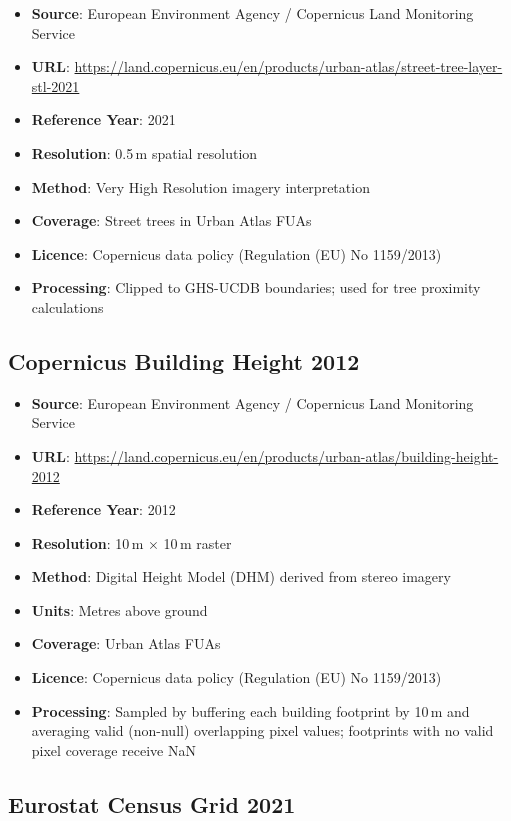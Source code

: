 \begin{itemize}
  \item \textbf{Source}: European Environment Agency / Copernicus Land Monitoring Service
  \item \textbf{URL}: \url{https://land.copernicus.eu/en/products/urban-atlas/street-tree-layer-stl-2021}
  \item \textbf{Reference Year}: 2021
  \item \textbf{Resolution}: 0.5\,m spatial resolution
  \item \textbf{Method}: Very High Resolution imagery interpretation
  \item \textbf{Coverage}: Street trees in Urban Atlas FUAs
  \item \textbf{Licence}: Copernicus data policy (Regulation (EU) No 1159/2013)
  \item \textbf{Processing}: Clipped to GHS-UCDB boundaries; used for tree proximity calculations
\end{itemize}

\subsection{Copernicus Building Height 2012}

\begin{itemize}
  \item \textbf{Source}: European Environment Agency / Copernicus Land Monitoring Service
  \item \textbf{URL}: \url{https://land.copernicus.eu/en/products/urban-atlas/building-height-2012}
  \item \textbf{Reference Year}: 2012
  \item \textbf{Resolution}: 10\,m $\times$ 10\,m raster
  \item \textbf{Method}: Digital Height Model (DHM) derived from stereo imagery
  \item \textbf{Units}: Metres above ground
  \item \textbf{Coverage}: Urban Atlas FUAs
  \item \textbf{Licence}: Copernicus data policy (Regulation (EU) No 1159/2013)
  \item \textbf{Processing}: Sampled by buffering each building footprint by 10\,m and averaging valid (non-null) overlapping pixel values; footprints with no valid pixel coverage receive NaN
\end{itemize}

\subsection{Eurostat Census Grid 2021}


